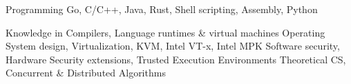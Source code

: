 


\begin{cvskills}



\cvskill
{Programming} %
{Go, C/C++, Java, Rust, Shell scripting, Assembly, Python} %


\cvskill
{Knowledge in} %
{\linebreak Compilers, Language runtimes \& virtual machines\linebreak
 Operating System design, Virtualization, KVM, Intel VT-x, Intel MPK\linebreak
 Software security, Hardware Security extensions, Trusted Execution Environments\linebreak
  Theoretical CS, Concurrent \& Distributed Algorithms} %

\end{cvskills}
